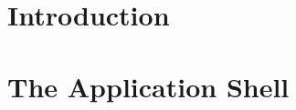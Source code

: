 \documentclass{report}
\begin{document}
    \part{Introduction}
    
    \part{The Application Shell}
    
\end{document}
